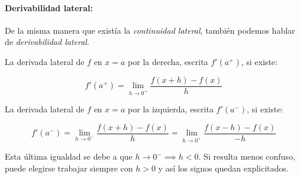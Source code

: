 \paragraph{Derivabilidad lateral:} De la misma manera que existía la \textit{continuidad lateral}, también podemos hablar de \textit{derivabilidad lateral}. 

\begin{defn}
La derivada lateral de $f$ en $x=a$ por la derecha, escrita $f'(a^+)$, si existe:

\[f'(a^+) = \lim_{h\to 0^+} \frac{f(x+h)-f(x)}{h}\]

La derivada lateral de $f$ en $x=a$ por la izquierda, escrita $f'(a^-)$, si existe:

\[f'(a^-) = \lim_{h\to 0^-} \frac{f(x+h)-f(x)}{h} =  \lim_{h\to 0^+} \frac{f(x-h)-f(x)}{-h}\]

\obs Esta última igualdad se debe a que $h\to 0^-\implies h<0$. Si resulta menos confuso, puede elegirse trabajar siempre con $h>0$ y así los signos quedan explicitados.
\end{defn}

